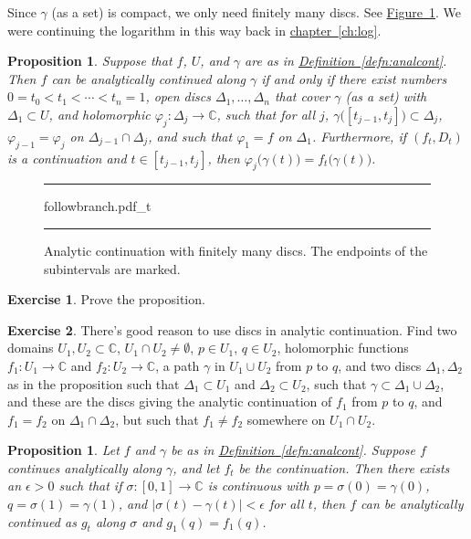\documentclass[12pt,openany]{book}
\newcommand{\sabs}[1]{\lvert {#1} \rvert}
\newcommand{\C}{{\mathbb{C}}}
\theoremstyle{plain}
\newtheorem{prop}[thm]{Proposition}
\theoremstyle{remark}
\theoremstyle{definition}
\newenvironment{exbox}{%
    \def\FrameCommand{\vrule width 1pt \relax\hspace{10pt}}%
    \MakeFramed{\advance\hsize-\width\FrameRestore}%
}{%
    \endMakeFramed
}
\newenvironment{myfig}{%
\begin{figure}[h!t]
\noindent\rule{\textwidth}{0.5pt}\vspace{12pt}\par\centering}%
{\par\noindent\rule{\textwidth}{0.5pt}
\end{figure}}
\theoremstyle{exercise}
\newtheorem{exercise}{Exercise}[section]
\theoremstyle{example}
\newcommand{\figureref}[1]{\hyperref[#1]{Figure~\ref*{#1}}}
\newcommand{\chapterref}[1]{\hyperref[#1]{chapter~\ref*{#1}}}
\newcommand{\defnref}[1]{\hyperref[#1]{Definition~\ref*{#1}}}
\begin{document}
Since $\gamma$ (as a set) is compact, we only need finitely many
discs.  See \figureref{fig:followbranch2}.
We were continuing the logarithm in this way back in
\chapterref{ch:log}.

\begin{prop} \label{prop:finitedisccont}
Suppose that $f$, $U$, and $\gamma$ are as in \defnref{defn:analcont}.
Then
$f$ can be analytically continued along $\gamma$
if and only if there exist numbers $0 = t_0 < t_1 < \cdots < t_n = 1$,
open discs
$\Delta_1,\ldots,\Delta_n$ that cover $\gamma$ (as a set) with
$\Delta_1 \subset U$,
and holomorphic $\varphi_j \colon \Delta_j \to \C$,
such that for all $j$, $\gamma\bigl([t_{j-1},t_j]\bigr) \subset \Delta_j$,
$\varphi_{j-1} = \varphi_j$ on $\Delta_{j-1} \cap \Delta_j$,
and such that $\varphi_1 = f$ on $\Delta_1$.
Furthermore, if $(f_t,D_t)$ is a continuation and $t \in [t_{j-1},t_j]$,
then $\varphi_j\bigl(\gamma(t)\bigr) = f_t\bigl(\gamma(t)\bigr)$.
\end{prop}

\begin{myfig}
{followbranch.pdf_t}
\caption{Analytic continuation with finitely many discs.  The endpoints of
the subintervals are marked.\label{fig:followbranch2}}
\end{myfig}

\begin{exbox}
\begin{exercise}
Prove the proposition.
\end{exercise}

\begin{exercise}
There's good reason to use discs in analytic continuation.  Find two domains
$U_1, U_2 \subset \C$, $U_1 \cap U_2 \neq \emptyset$,
$p \in U_1$, $q \in U_2$, holomorphic functions
$f_1 \colon U_1 \to \C$ and $f_2 \colon U_2 \to \C$,
a path $\gamma$ in $U_1 \cup U_2$ from $p$ to $q$, and two discs $\Delta_1,\Delta_2$
as in the proposition such that $\Delta_1 \subset U_1$ and $\Delta_2 \subset
U_2$, such that $\gamma \subset \Delta_1 \cup \Delta_2$, and these are the
discs giving the analytic continuation of $f_1$ from $p$ to $q$, and $f_1 =
f_2$ on $\Delta_1 \cap \Delta_2$, but such that $f_1 \neq f_2$ somewhere
on $U_1 \cap U_2$.
\end{exercise}
\end{exbox}

\begin{prop} \label{prop:continuationclose}
Let $f$ and $\gamma$ be as in \defnref{defn:analcont}.
Suppose $f$ continues analytically along $\gamma$, and let
$f_t$ be the continuation.
Then there exists an $\epsilon > 0$ such that if
$\sigma \colon [0,1] \to \C$ is continuous with $p=\sigma(0)=\gamma(0)$,
$q=\sigma(1)=\gamma(1)$, and
$\sabs{\sigma(t)-\gamma(t)} < \epsilon$ for all $t$,
then
$f$ can be analytically continued as $g_t$ along $\sigma$ and
$g_1(q)=f_1(q)$.
\end{prop}
\end{document}
